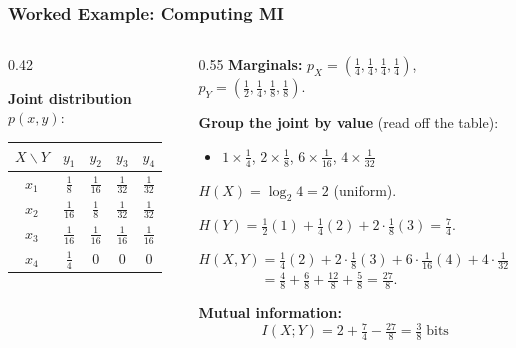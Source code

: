 \documentclass[aspectratio=169]{beamer}
\begin{document}
\begin{frame}
\frametitle{Worked Example: Computing MI}

\small
\renewcommand{\arraystretch}{1.3}
\begin{columns}[T]
\begin{column}{0.42\textwidth}
\begin{center}
\textbf{Joint distribution} $p(x,y)$:\\[4pt]
\begin{tabular}{c|cccc}
  $X \backslash Y$ & $y_1$ & $y_2$ & $y_3$ & $y_4$ \\
  \hline
  $x_1$ & $\frac{1}{8}$ & $\frac{1}{16}$ & $\frac{1}{32}$ & $\frac{1}{32}$ \\[4pt]
  $x_2$ & $\frac{1}{16}$ & $\frac{1}{8}$ & $\frac{1}{32}$ & $\frac{1}{32}$ \\[4pt]
  $x_3$ & $\frac{1}{16}$ & $\frac{1}{16}$ & $\frac{1}{16}$ & $\frac{1}{16}$ \\[4pt]
  $x_4$ & $\frac{1}{4}$ & $0$ & $0$ & $0$ \\
\end{tabular}
\end{center}
\end{column}
\begin{column}{0.55\textwidth}
\footnotesize
\textbf{Marginals:} \;$p_X = (\tfrac{1}{4},\tfrac{1}{4},\tfrac{1}{4},\tfrac{1}{4})$, \;$p_Y = (\tfrac{1}{2},\tfrac{1}{4},\tfrac{1}{8},\tfrac{1}{8})$.

\vspace{0.1cm}
\textbf{Group the joint by value} (read off the table):
\begin{itemize}\setlength{\itemsep}{0pt}
  \item $1 \times \tfrac{1}{4}$, \;\;$2 \times \tfrac{1}{8}$, \;\;$6 \times \tfrac{1}{16}$, \;\;$4 \times \tfrac{1}{32}$
\end{itemize}

\vspace{0.05cm}
$H(X) = \log_2 4 = 2$ \;(uniform).

$H(Y) = \tfrac{1}{2}(1) + \tfrac{1}{4}(2) + 2\cdot\tfrac{1}{8}(3) = \tfrac{7}{4}$.

\vspace{0.02cm}
$H(X,Y) = \tfrac{1}{4}(2) + 2\cdot\tfrac{1}{8}(3) + 6\cdot\tfrac{1}{16}(4) + 4\cdot\tfrac{1}{32}(5)$\\
$\phantom{H(X,Y)} = \tfrac{4}{8} + \tfrac{6}{8} + \tfrac{12}{8} + \tfrac{5}{8} = \tfrac{27}{8}$.

\vspace{0.1cm}
\textbf{Mutual information:}
$$I(X;Y) = 2 + \tfrac{7}{4} - \tfrac{27}{8} = \boxed{\tfrac{3}{8} \;\text{bits}}$$
\end{column}
\end{columns}
\end{frame}
\end{document}
